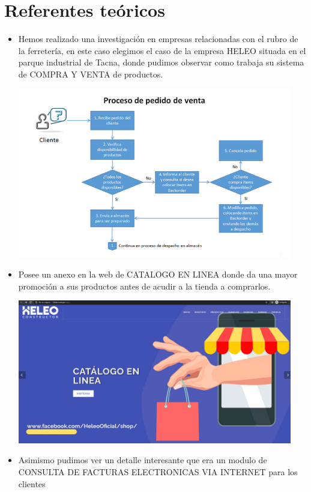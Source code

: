\documentclass[preprint,12pt]{elsarticle}
\begin{document}
	\section{Referentes teóricos}
\begin{itemize} 
    \item Hemos realizado una investigación en empresas relacionadas con el rubro de la ferretería, en este caso elegimos el caso de la empresa HELEO situada en el parque industrial de Tacna, donde pudimos observar como trabaja su sistema de COMPRA Y VENTA de productos.\cite{refaquino3}
	\begin{center}
	\includegraphics[width=12cm]{./imagen/1} 
	\end{center}
	\item Posee un anexo en la web de CATALOGO EN LINEA donde da una mayor promoción a sus productos antes de acudir a la tienda a comprarlos.
	\begin{center}
	\includegraphics[width=12cm]{./imagen/2} 
	\end{center}
	\item Asimismo pudimos ver un detalle interesante que era un modulo de CONSULTA DE FACTURAS ELECTRONICAS VIA INTERNET para los clientes
	\begin{center}

\end{center}
\end{itemize}
\end{document}
